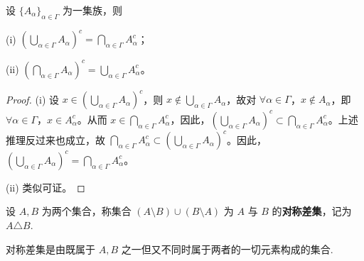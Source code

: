 \documentclass[../../main.tex]{subfiles}
\begin{document}
\begin{theorem}[De Morgan定律]\label{theorem:De Morgan定律}
设 \(\{A_{\alpha}\}_{\alpha \in \varGamma}\) 为一集族，则

(i) \((\bigcup_{\alpha \in \varGamma} A_{\alpha})^c = \bigcap_{\alpha \in \varGamma} A_{\alpha}^c\)；

(ii) \((\bigcap_{\alpha \in \varGamma} A_{\alpha})^c = \bigcup_{\alpha \in \varGamma} A_{\alpha}^c\)。
\end{theorem}
\begin{proof}
(i) 设 \(x \in (\bigcup_{\alpha \in \varGamma} A_{\alpha})^c\)，则 \(x \notin \bigcup_{\alpha \in \varGamma} A_{\alpha}\)，故对 \(\forall \alpha \in \varGamma\)，\(x \notin A_{\alpha}\)，即 \(\forall \alpha \in \varGamma\)，\(x \in A_{\alpha}^c\)。从而 \(x \in \bigcap_{\alpha \in \varGamma} A_{\alpha}^c\)，因此，\((\bigcup_{\alpha \in \varGamma} A_{\alpha})^c \subset \bigcap_{\alpha \in \varGamma} A_{\alpha}^c\)。上述推理反过来也成立，故 \(\bigcap_{\alpha \in \varGamma} A_{\alpha}^c \subset (\bigcup_{\alpha \in \varGamma} A_{\alpha})^c\)。因此，\((\bigcup_{\alpha \in \varGamma} A_{\alpha})^c = \bigcap_{\alpha \in \varGamma} A_{\alpha}^c\)。

(ii) 类似可证。 
\end{proof}

\begin{definition}[对称差集]
设 \( A,B \) 为两个集合，称集合 \( (A \setminus B) \cup (B \setminus A) \) 为 \( A \) 与 \( B \) 的\textbf{对称差集}，记为 \( A \triangle B \).
\end{definition}
\begin{note}
对称差集是由既属于 \( A,B \) 之一但又不同时属于两者的一切元素构成的集合.
\end{note}
\end{document}
